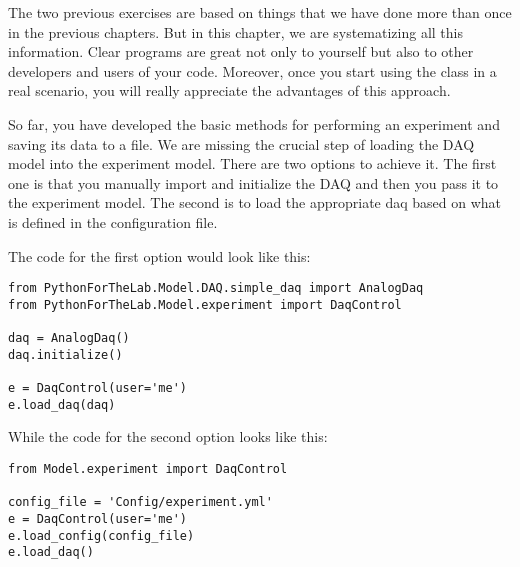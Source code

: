 
The two previous exercises are based on things that we have done more than once in the previous chapters. But in this chapter, we are systematizing all this information. Clear programs are great not only to yourself but also to other developers and users of your code. Moreover, once you start using the class in a real scenario, you will really appreciate the advantages of this approach.


So far, you have developed the basic methods for performing an experiment and saving its data to a file. We are missing the crucial step of loading the {DAQ} model into the experiment model. There are two options to achieve it. The first one is that you manually import and initialize the {DAQ} and then you pass it to the experiment model. The second is to load the appropriate daq based on what is defined in the configuration file.

The code for the first option would look like this:

\begin{verbatim}
from PythonForTheLab.Model.DAQ.simple_daq import AnalogDaq
from PythonForTheLab.Model.experiment import DaqControl

daq = AnalogDaq()
daq.initialize()

e = DaqControl(user='me')
e.load_daq(daq)
\end{verbatim}

While the code for the second option looks like this:

\begin{verbatim}
from Model.experiment import DaqControl

config_file = 'Config/experiment.yml'
e = DaqControl(user='me')
e.load_config(config_file)
e.load_daq()
\end{verbatim}

